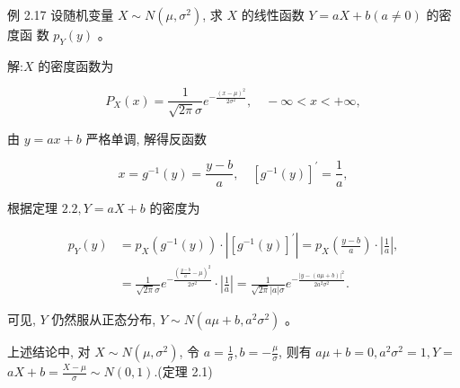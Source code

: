 \documentclass{beamer}
\begin{document}
	\begin{frame}
		例 2.17 设随机变量 $X \sim N\left(\mu, \sigma^{2}\right)$, 求 $X$ 的线性函数 $Y=a X+b(a \neq 0)$ 的密度函 数 $p_{Y}(y)$ 。
	\end{frame}
	
	\begin{frame}
		解:$X$ 的密度函数为
		
		$$
		P_{X}(x)=\frac{1}{\sqrt{2 \pi} \sigma} e^{-\frac{(x-\mu)^{2}}{2 \sigma^{2}}}, \quad-\infty<x<+\infty,
		$$
		
		由 $y=a x+b$ 严格单调, 解得反函数
		
		$$
		x=g^{-1}(y)=\frac{y-b}{a}, \quad\left[g^{-1}(y)\right]^{\prime}=\frac{1}{a},
		$$
		
		根据定理 $2.2, Y=a X+b$ 的密度为
		
		$$
		\begin{aligned}
			p_{Y}(y) & =p_{X}\left(g^{-1}(y)\right) \cdot\left|\left[g^{-1}(y)\right]^{\prime}\right|=p_{X}\left(\frac{y-b}{a}\right) \cdot\left|\frac{1}{a}\right|, \\
			& =\frac{1}{\sqrt{2 \pi} \sigma} e^{-\frac{\left(\frac{y-b}{a}-\mu\right)^{2}}{2 \sigma^{2}}} \cdot\left|\frac{1}{a}\right|=\frac{1}{\sqrt{2 \pi}|a| \sigma} e^{-\frac{|y-(a \mu+b)|^{2}}{2 a^{2} \sigma^{2}}} .
		\end{aligned}
		$$
		
		可见, $Y$ 仍然服从正态分布, $Y \sim N\left(a \mu+b, a^{2} \sigma^{2}\right)$ 。
		
		上述结论中, 对 $X \sim N\left(\mu, \sigma^{2}\right)$, 令 $a=\frac{1}{\sigma}, b=-\frac{\mu}{\sigma}$, 则有 $a \mu+b=0, a^{2} \sigma^{2}=1, Y=$ $a X+b=\frac{X-\mu}{\sigma} \sim N(0,1)$.(定理 2.1)
	\end{frame}
\end{document}
